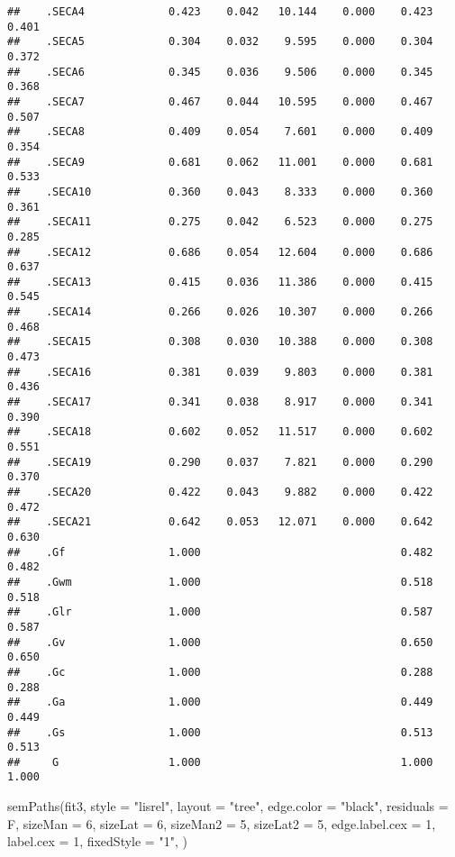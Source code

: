 \documentclass[
]{article}
\newenvironment{Shaded}{\begin{snugshade}}{\end{snugshade}}
\newcommand{\AttributeTok}[1]{\textcolor[rgb]{0.77,0.63,0.00}{#1}}
\newcommand{\DecValTok}[1]{\textcolor[rgb]{0.00,0.00,0.81}{#1}}
\newcommand{\FunctionTok}[1]{\textcolor[rgb]{0.00,0.00,0.00}{#1}}
\newcommand{\NormalTok}[1]{#1}
\newcommand{\StringTok}[1]{\textcolor[rgb]{0.31,0.60,0.02}{#1}}
\begin{document}
\begin{verbatim}
##    .SECA4             0.423    0.042   10.144    0.000    0.423    0.401
##    .SECA5             0.304    0.032    9.595    0.000    0.304    0.372
##    .SECA6             0.345    0.036    9.506    0.000    0.345    0.368
##    .SECA7             0.467    0.044   10.595    0.000    0.467    0.507
##    .SECA8             0.409    0.054    7.601    0.000    0.409    0.354
##    .SECA9             0.681    0.062   11.001    0.000    0.681    0.533
##    .SECA10            0.360    0.043    8.333    0.000    0.360    0.361
##    .SECA11            0.275    0.042    6.523    0.000    0.275    0.285
##    .SECA12            0.686    0.054   12.604    0.000    0.686    0.637
##    .SECA13            0.415    0.036   11.386    0.000    0.415    0.545
##    .SECA14            0.266    0.026   10.307    0.000    0.266    0.468
##    .SECA15            0.308    0.030   10.388    0.000    0.308    0.473
##    .SECA16            0.381    0.039    9.803    0.000    0.381    0.436
##    .SECA17            0.341    0.038    8.917    0.000    0.341    0.390
##    .SECA18            0.602    0.052   11.517    0.000    0.602    0.551
##    .SECA19            0.290    0.037    7.821    0.000    0.290    0.370
##    .SECA20            0.422    0.043    9.882    0.000    0.422    0.472
##    .SECA21            0.642    0.053   12.071    0.000    0.642    0.630
##    .Gf                1.000                               0.482    0.482
##    .Gwm               1.000                               0.518    0.518
##    .Glr               1.000                               0.587    0.587
##    .Gv                1.000                               0.650    0.650
##    .Gc                1.000                               0.288    0.288
##    .Ga                1.000                               0.449    0.449
##    .Gs                1.000                               0.513    0.513
##     G                 1.000                               1.000    1.000
\end{verbatim}

\begin{Shaded}
\begin{Highlighting}[]
\FunctionTok{semPaths}\NormalTok{(fit3, }\AttributeTok{style =} \StringTok{"lisrel"}\NormalTok{, }\AttributeTok{layout =} \StringTok{"tree"}\NormalTok{, }\AttributeTok{edge.color =} \StringTok{"black"}\NormalTok{,}
         \AttributeTok{residuals =}\NormalTok{ F, }\AttributeTok{sizeMan =} \DecValTok{6}\NormalTok{, }\AttributeTok{sizeLat =} \DecValTok{6}\NormalTok{, }\AttributeTok{sizeMan2 =} \DecValTok{5}\NormalTok{, }\AttributeTok{sizeLat2 =} \DecValTok{5}\NormalTok{, }
         \AttributeTok{edge.label.cex =} \DecValTok{1}\NormalTok{, }\AttributeTok{label.cex =} \DecValTok{1}\NormalTok{, }\AttributeTok{fixedStyle =} \StringTok{"1"}\NormalTok{, )}
\end{Highlighting}
\end{Shaded}
\end{document}
